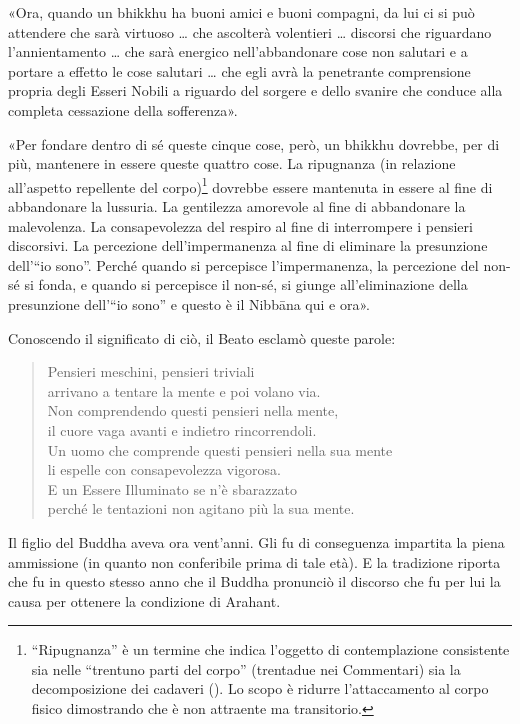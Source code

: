 «Ora, quando un bhikkhu ha buoni amici e buoni compagni, da lui ci si può
attendere che sarà virtuoso … che ascolterà volentieri … discorsi che riguardano
l’annientamento … che sarà energico nell’abbandonare cose non salutari e a
portare a effetto le cose salutari … che egli avrà la penetrante comprensione
propria degli Esseri Nobili a riguardo del sorgere e dello svanire che conduce
alla completa cessazione della sofferenza».

«Per fondare dentro di sé queste cinque cose, però, un bhikkhu dovrebbe, per di
più, mantenere in essere queste quattro cose. La ripugnanza (in relazione
all’aspetto repellente del corpo)\footnote{“Ripugnanza” è un termine che indica
  l’oggetto di contemplazione consistente sia nelle “trentuno parti del corpo”
  (trentadue nei Commentari) sia la decomposizione dei cadaveri
  (\hyperlink{cap-12-La-Dottrina#pag270}{}). Lo scopo è ridurre l’attaccamento
  al corpo fisico dimostrando che è non attraente ma transitorio.} dovrebbe
essere mantenuta in essere al fine di abbandonare la lussuria. La gentilezza
amorevole al fine di abbandonare la malevolenza. La consapevolezza del respiro
al fine di interrompere i pensieri discorsivi. La percezione dell’impermanenza
al fine di eliminare la presunzione dell’“io sono”. Perché quando si percepisce
l’impermanenza, la percezione del non-sé si fonda, e quando si percepisce il
non-sé, si giunge all’eliminazione della presunzione dell’“io sono” e questo è
il Nibbāna qui e ora».

Conoscendo il significato di ciò, il Beato esclamò queste parole:

\begin{quote}
Pensieri meschini, pensieri triviali \\
arrivano a tentare la mente e poi volano via. \\
Non comprendendo questi pensieri nella mente, \\
il cuore vaga avanti e indietro rincorrendoli. \\
Un uomo che comprende questi pensieri nella sua mente \\
li espelle con consapevolezza vigorosa. \\
E un Essere Illuminato se n’è sbarazzato \\
perché le tentazioni non agitano più la sua mente.
\end{quote}


 Il figlio del Buddha aveva ora vent’anni. Gli fu
di conseguenza impartita la piena ammissione (in quanto non conferibile prima di
tale età). E la tradizione riporta che fu in questo stesso anno che il Buddha
pronunciò il discorso che fu per lui la causa per ottenere la condizione di
Arahant.


